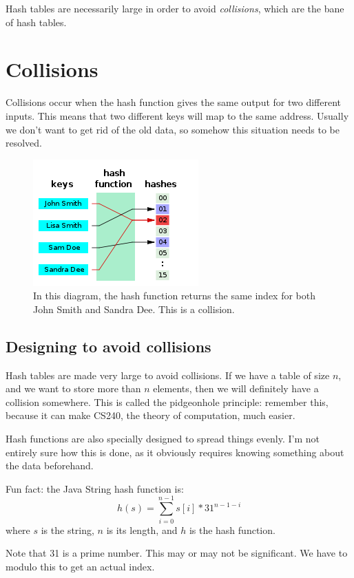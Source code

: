 \documentclass{article}
\begin{document}
Hash tables are necessarily large in order to avoid \textit{collisions}, which are the bane of hash tables.

\section{Collisions}

Collisions occur when the hash function gives the same output for two different inputs.  This means that two different keys will map to the same address.  Usually we don't want to get rid of the old data, so somehow this situation needs to be resolved.

\begin{figure}
\centering
\includegraphics[scale=0.7]{img/collision.png}
\caption{In this diagram, the hash function returns the same index for both John Smith and Sandra Dee.  This is a collision.}
\end{figure}

\subsection{Designing to avoid collisions}
Hash tables are made very large to avoid collisions.  If we have a table of size $n$, and we want to store more than $n$ elements, then we will definitely have a collision somewhere.  This is called the pidgeonhole principle: remember this, because it can make CS240, the theory of computation, much easier.

Hash functions are also specially designed to spread things evenly.  I'm not entirely sure how this is done, as it obviously requires knowing something about the data beforehand.

Fun fact: the Java String hash function is:
\[
h(s) = \sum_{i=0}^{n-1} s[i] * 31^{n-1-i}
\]
where $s$ is the string, $n$ is its length, and $h$ is the hash function.

Note that 31 is a prime number.  This may or may not be significant.  We have to modulo this to get an actual index.
\end{document}
